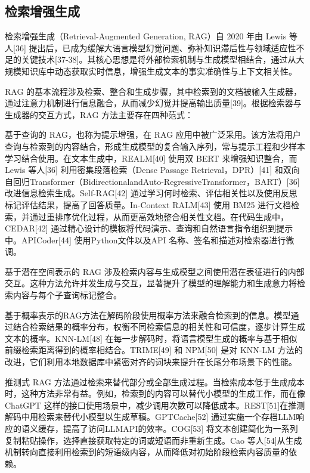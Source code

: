 \documentclass[12pt,a4paper,openright,UTF8]{ctexbook}
\begin{document}
\subsection{检索增强生成}

检索增强生成（Retrieval-Augmented Generation, RAG）自 2020 年由 Lewis 等人[36] 提出后，已成为缓解大语言模型幻觉问题、弥补知识滞后性与领域适应性不足的关键技术[37-38]。其核心思想是将外部检索机制与生成模型相结合，通过从大规模知识库中动态获取实时信息，增强生成文本的事实准确性与上下文相关性。


RAG 的基本流程涉及检索、整合和生成步骤，其中检索到的文档被输入生成器，通过注意力机制进行信息融合，从而减少幻觉并提高输出质量[39]。根据检索器与生成器的交互方式，RAG 方法主要存在四种范式：


基于查询的 RAG，也称为提示增强，在 RAG 应用中被广泛采用。该方法将用户查询与检索到的内容结合，形成生成模型的复合输入序列，常与提示工程和少样本学习结合使用。在文本生成中，REALM[40] 使用双 BERT 来增强知识整合，而 Lewis 等人[36] 利用密集段落检索（Dense Passage Retrieval，DPR）[41] 和双向自回归Transformer（BidirectionalandAuto-RegressiveTransformer，BART）[36] 改进信息检索生成。Self-RAG[42] 通过学习何时检索、评估相关性以及使用反思标记评估结果，提高了回答质量。In-Context RALM[43] 使用 BM25 进行文档检索，并通过重排序优化过程，从而更高效地整合相关性文档。在代码生成中，CEDAR[42] 通过精心设计的模板将代码演示、查询和自然语言指令组织到提示中。APICoder[44] 使用Python文件以及API 名称、签名和描述对检索器进行微调。


基于潜在空间表示的 RAG 涉及检索内容与生成模型之间使用潜在表征进行的内部交互。这种方法允许并发生成与交互，显著提升了模型的理解能力和生成意力将检索内容与每个子查询标记整合。


基于概率表示的RAG方法在解码阶段使用概率方法来融合检索到的信息。模型通过结合检索结果的概率分布，权衡不同检索信息的相关性和可信度，逐步计算生成文本的概率。KNN-LM[48] 在每一步解码时，将语言模型生成的概率与基于相似前缀检索距离得到的概率相结合。TRIME[49] 和 NPM[50] 是对 KNN-LM 方法的改进，它们利用本地数据库中紧密对齐的词块来提升在长尾分布场景下的性能。


推测式 RAG 方法通过检索来替代部分或全部生成过程。当检索成本低于生成成本时，这种方法非常有益。例如，检索到的内容可以替代小模型的生成工作，而在像 ChatGPT 这样的接口使用场景中，减少调用次数可以降低成本。REST[51]在推测解码中用检索来替代小模型以生成草稿。GPTCache[52] 通过实施一个存档LLM响应的语义缓存，提高了访问LLMAPI的效率。COG[53] 将文本创建简化为一系列复制粘贴操作，选择直接获取特定的词或短语而非重新生成。Cao 等人[54]从生成机制转向直接利用检索到的短语级内容，从而降低对初始阶段检索内容质量的依赖。
\end{document}
